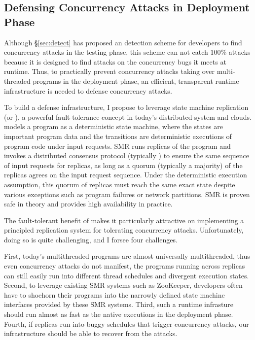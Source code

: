 \subsection{Defensing Concurrency Attacks in Deployment Phase} 
\label{sec:defense}

Although \S\ref{sec:detect} has proposed an detection scheme for developers to 
find concurrency attacks in the testing phase, this scheme can not catch 100\% 
attacks because it is designed to find attacks on the concurrency bugs it meets 
at runtime. Thus, to practically prevent concurrency attacks taking over 
multi-threaded programs in the deployment phase, an efficient, transparent 
runtime infrastructure is needed to defense concurrency attacks.

To build a defense infrastructure, I propose to leverage state machine 
replication (or \smr), a powerful fault-tolerance concept in today's 
distributed system and clouds. \smr models a program as a deterministic
state machine, where the states are important program data and the transitions 
are deterministic executions of program code under input requests. SMR runs 
replicas of the program and invokes a distributed consensus protocol 
(typically \paxos) to ensure the same sequence of input requests for replicas, 
as long as a quorum (typically a majority) of the replicas agrees on the input 
request sequence. Under the deterministic execution assumption, this quorum of 
replicas must reach the same exact state despite various exceptions such as 
program failures or network partitions. SMR is proven safe in theory and 
provides high availability in practice.

The fault-tolerant benefit of \smr makes it particularly attractive
on implementing a principled replication system for tolerating concurrency 
attacks. Unfortunately, doing so is quite challenging, and I forsee four 
challenges.

First, today’s multithreaded programs are almost universally
multithreaded, thus even concurrency attacks do not manifest, the programs 
running across replicas can still easily run into different thread schedules 
and divergent execution states. Second, to leverage existing SMR systems such 
as ZooKeeper, developers often have to shoehorn their programs into the 
narrowly defined state machine interfaces provided by these SMR systems. Third, 
such a runtime infrasture should run almost as fast as the native executions in 
the deployment phase. Fourth, if replicas run into buggy schedules that trigger 
concurrency attacks, our infrastructure should be able to recover from the 
attacks.

